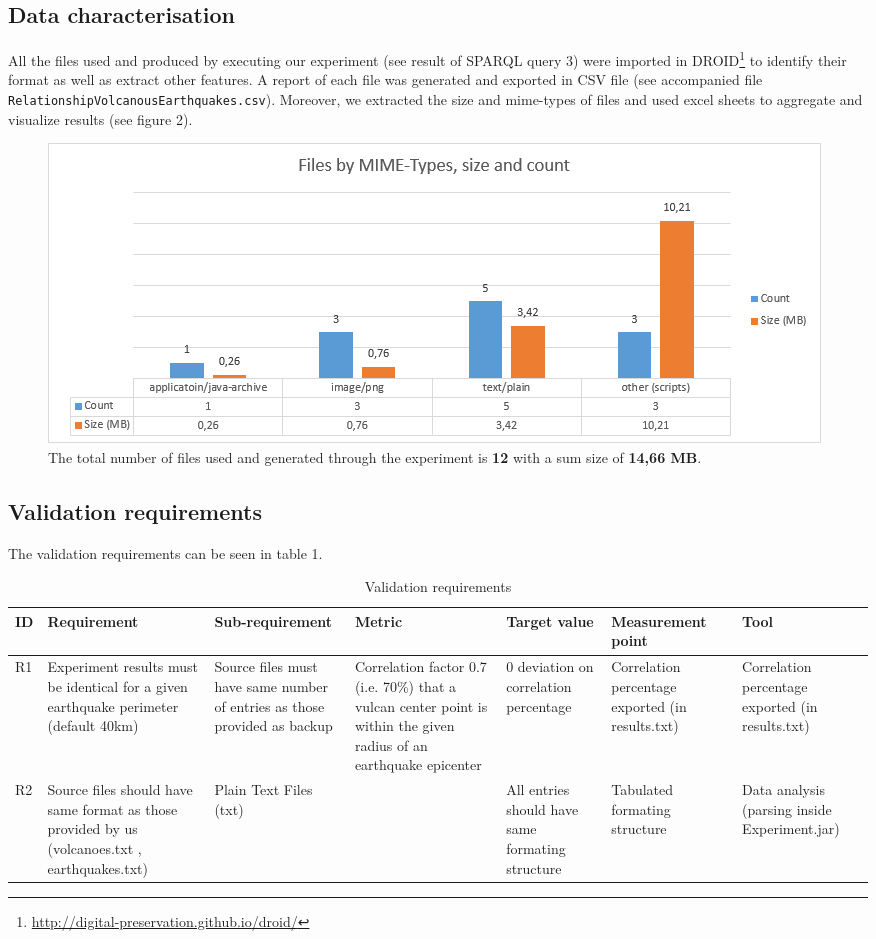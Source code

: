 \documentclass[12pt, a4paper]{article}
\begin{document}
\subsection{Data characterisation}
All the files used and produced by executing our experiment (see result of SPARQL query 3) were imported in DROID\footnote{\url{http://digital-preservation.github.io/droid/}} to identify their format as well as extract other features. A report of each file was generated and exported in CSV file (see accompanied file \verb|RelationshipVolcanousEarthquakes.csv|). Moreover, we extracted the size and mime-types of files and used excel sheets to aggregate and visualize results (see figure 2).
\begin{figure}[h]
  \centering
    \includegraphics[scale=0.85]{graph}
    \caption{The total number of files used and generated through the experiment is {\bf 12} with a sum size of {\bf 14,66 MB}.}
\end{figure}

\subsection{Validation requirements}
The validation requirements can be seen in table 1.
\begin{table}[h]
\centering
\begin{tabular}{|p{0.5cm}|p{3.0cm}|p{3.5cm}|p{3.0cm}|p{1.5cm}|p{3.0cm}|p{2.0cm}|}
\hline
 \textbf{ID} & \textbf{Requirement} & \textbf{Sub-requirement} & \textbf{Metric} & \textbf{Target value} & \textbf{Measurement point} & \textbf{Tool} \\ \hline
 R1 & Experiment results must be identical for a given earthquake perimeter (default 40km) & Source files must have same number of entries as those provided as backup & 
Correlation factor 0.7 (i.e. 70\%) that a vulcan center point is within the given radius of an earthquake epicenter
 & 0 deviation on correlation percentage & Correlation percentage exported (in results.txt) & Correlation percentage exported (in results.txt) \\ \hline
 R2 &  Source files should have same format as those provided by us (volcanoes.txt , earthquakes.txt) & Plain Text Files (txt) & &
All entries should have same formating structure & Tabulated formating structure & Data analysis (parsing inside Experiment.jar)      \\ \hline
\end{tabular}
\caption{Validation requirements}
\end{table}
\end{document}

